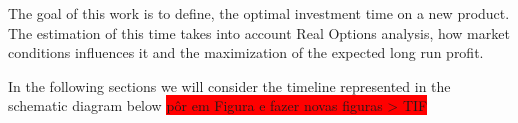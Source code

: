 
The goal of this work is to define,
 the optimal investment time on a new product. The estimation of this time takes into account Real Options analysis, how market conditions influences it and 
 the maximization of the expected long run profit.

In the following sections we will consider the timeline represented in the schematic diagram below 
\colorbox{red}{pôr em Figura e fazer  novas figuras > TIF}

%
%
%
%
%
%
%
%
%
%
%


